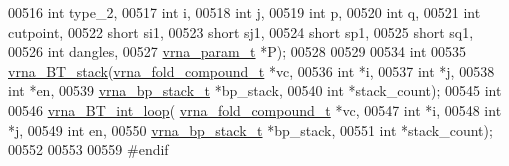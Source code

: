 \begin{DoxyCode}
00516               \textcolor{keywordtype}{int} type\_2,
00517               \textcolor{keywordtype}{int} i,
00518               \textcolor{keywordtype}{int} j,
00519               \textcolor{keywordtype}{int} p,
00520               \textcolor{keywordtype}{int} q,
00521               \textcolor{keywordtype}{int} cutpoint,
00522               \textcolor{keywordtype}{short} si1,
00523               \textcolor{keywordtype}{short} sj1,
00524               \textcolor{keywordtype}{short} sp1,
00525               \textcolor{keywordtype}{short} sq1,
00526               \textcolor{keywordtype}{int} dangles,
00527               \hyperlink{group__energy__parameters_structvrna__param__s}{vrna\_param\_t} *P);
00528 
00529 
00534 \textcolor{keywordtype}{int}
00535 \hyperlink{group__loops_gad320d5d721e33bed120168213d8f45e5}{vrna\_BT\_stack}(\hyperlink{group__fold__compound_structvrna__fc__s}{vrna\_fold\_compound\_t} *vc,
00536               \textcolor{keywordtype}{int} *i,
00537               \textcolor{keywordtype}{int} *j,
00538               \textcolor{keywordtype}{int} *en,
00539               \hyperlink{group__data__structures_structvrna__bp__stack__s}{vrna\_bp\_stack\_t} *bp\_stack,
00540               \textcolor{keywordtype}{int} *stack\_count);
00545 \textcolor{keywordtype}{int}
00546 \hyperlink{group__loops_ga849b7dc373b6c0b029672e16a7e52053}{vrna\_BT\_int\_loop}( \hyperlink{group__fold__compound_structvrna__fc__s}{vrna\_fold\_compound\_t} *vc,
00547                   \textcolor{keywordtype}{int} *i,
00548                   \textcolor{keywordtype}{int} *j,
00549                   \textcolor{keywordtype}{int} en,
00550                   \hyperlink{group__data__structures_structvrna__bp__stack__s}{vrna\_bp\_stack\_t} *bp\_stack,
00551                   \textcolor{keywordtype}{int} *stack\_count);
00552 
00553 
00559 \textcolor{preprocessor}{#endif}
\end{DoxyCode}
